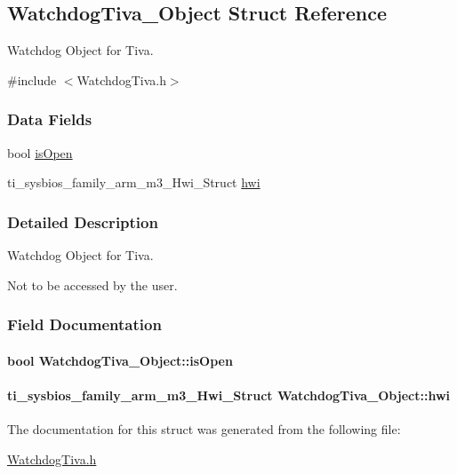\subsection{Watchdog\-Tiva\-\_\-\-Object Struct Reference}
\label{struct_watchdog_tiva___object}


Watchdog Object for Tiva.  




{\ttfamily \#include $<$Watchdog\-Tiva.\-h$>$}

\subsubsection*{Data Fields}
\begin{DoxyCompactItemize}
\item 
bool \hyperlink{struct_watchdog_tiva___object_ae0d4184d8bf76a7db3ca4e7ef5252dbd}{is\-Open}
\item 
ti\-\_\-sysbios\-\_\-family\-\_\-arm\-\_\-m3\-\_\-\-Hwi\-\_\-\-Struct \hyperlink{struct_watchdog_tiva___object_a2b8d42f5107ecf7fa883f1eebd687f11}{hwi}
\end{DoxyCompactItemize}


\subsubsection{Detailed Description}
Watchdog Object for Tiva. 

Not to be accessed by the user. 

\subsubsection{Field Documentation}
\paragraph[{is\-Open}]{\setlength{\rightskip}{0pt plus 5cm}bool Watchdog\-Tiva\-\_\-\-Object\-::is\-Open}\label{struct_watchdog_tiva___object_ae0d4184d8bf76a7db3ca4e7ef5252dbd}
\paragraph[{hwi}]{\setlength{\rightskip}{0pt plus 5cm}ti\-\_\-sysbios\-\_\-family\-\_\-arm\-\_\-m3\-\_\-\-Hwi\-\_\-\-Struct Watchdog\-Tiva\-\_\-\-Object\-::hwi}\label{struct_watchdog_tiva___object_a2b8d42f5107ecf7fa883f1eebd687f11}


The documentation for this struct was generated from the following file\-:\begin{DoxyCompactItemize}
\item 
\hyperlink{_watchdog_tiva_8h}{Watchdog\-Tiva.\-h}\end{DoxyCompactItemize}
